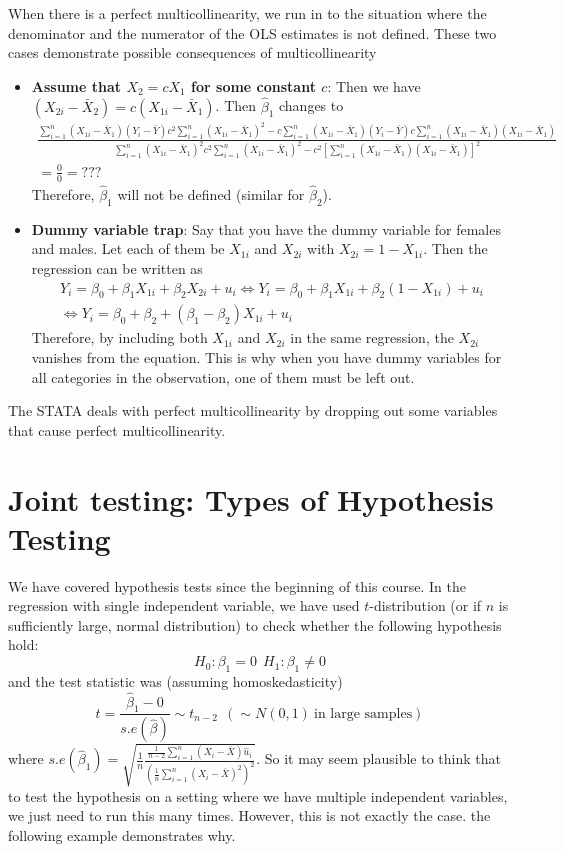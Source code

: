 When there is a perfect multicollinearity, we run in to the situation where the denominator and the numerator of the OLS estimates is not defined. These two cases demonstrate possible consequences of multicollinearity
\begin{itemize}
\item \textbf{Assume that $X_2 = cX_1$ for some constant $c$}: Then we have $(X_{2i}-\bar{X}_2)=c(X_{1i}-\bar{X}_1)$. Then $\hat{\beta}_1$ changes to
\scriptsize{\begin{gather*}
\frac{\sum_{i=1}^n (X_{1i}-\bar{X}_1)(Y_{i}-\bar{Y})c^2\sum_{i=1}^n(X_{1i}-\bar{X}_1)^2-c\sum_{i=1}^n (X_{1i}-\bar{X}_1)(Y_{i}-\bar{Y})c\sum_{i=1}^n(X_{1i}-\bar{X}_1)(X_{1i}-\bar{X}_1)}{\sum_{i=1}^n (X_{1i}-\bar{X}_1)^2 c^2\sum_{i=1}^n (X_{1i}-\bar{X}_1)^2-c^2[\sum_{i=1}^n (X_{1i}-\bar{X}_1)(X_{1i}-\bar{X}_1)]^2} \\
=\frac{0}{0} = ???
\end{gather*}}\normalsize
Therefore, $\hat{\beta}_1$ will not be defined (similar for $\hat{\beta}_2$).
\item \textbf{Dummy variable trap}: Say that you have the dummy variable for females and males. Let each of them be $X_{1i}$ and $X_{2i}$ with $X_{2i}=1-X_{1i}$. Then the regression can be written as
\begin{gather*}
Y_i = \beta_0 + \beta_1X_{1i} + \beta_2X_{2i} + u_i \iff Y_i = \beta_0 + \beta_1X_{1i} + \beta_2(1-X_{1i}) + u_i \\
\iff Y_i = \beta_0 + \beta_2 +(\beta_1-\beta_2)X_{1i}+u_i
\end{gather*}
Therefore, by including both $X_{1i}$ and $X_{2i}$ in the same regression, the $X_{2i}$ vanishes from the equation. This is why when you have dummy variables for all categories in the observation, one of them must be left out.
\end{itemize} \par\medskip
The STATA deals with perfect multicollinearity by dropping out some variables that cause perfect multicollinearity.

\section{Joint testing: Types of Hypothesis Testing}
We have covered hypothesis tests since the beginning of this course. In the regression with single independent variable, we have used $t$-distribution (or if $n$ is sufficiently large, normal distribution) to check whether the following hypothesis hold:
\[
H_0 : \beta_1 = 0 \ \ H_1 : \beta_1 \neq 0
\]
and the test statistic was (assuming homoskedasticity)
\[
t=\frac{\hat{\beta}_1-0}{s.e(\hat{\beta})}\sim t_{n-2} \ \ (\sim N(0,1) \ \text{in large samples})
\]
where $s.e(\hat{\beta}_1)=\sqrt{\frac{1}{n}\frac{\frac{1}{n-2}\sum_{i=1}^n(X_i-\bar{X})\hat{u}_i}{(\frac{1}{n}\sum_{i=1}^n (X_i-\bar{X})^2)^2}}$. So it may seem plausible to think that to test the hypothesis on a setting where we have multiple independent variables, we just need to run this many times. However, this is not exactly the case. the following example demonstrates why. \\ \par

